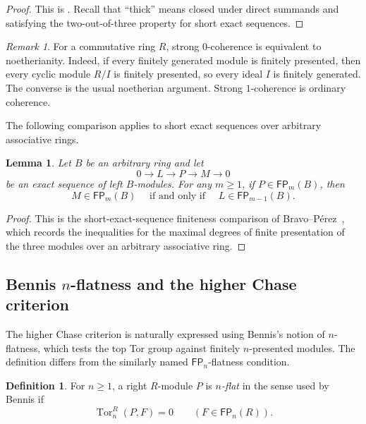 \documentclass[11pt]{article}
\numberwithin{equation}{section}
\newtheorem{lemma}[theorem]{Lemma}
\theoremstyle{definition}
\newtheorem{definition}[theorem]{Definition}
\theoremstyle{remark}
\newtheorem{remark}[theorem]{Remark}
\newcommand{\Tor}{\operatorname{Tor}}
\newcommand{\FP}{\mathsf{FP}}
\begin{document}
\begin{proof}
This is \cite[Theorem~2.4]{BravoPerez}.  Recall that ``thick'' means closed
under direct summands and satisfying the two-out-of-three property for short
exact sequences.
\end{proof}

\begin{remark}
For a commutative ring $R$, strong $0$-coherence is equivalent to
noetherianity.  Indeed, if every finitely generated module is finitely
presented, then every cyclic module $R/I$ is finitely presented, so every
ideal $I$ is finitely generated.  The converse is the usual noetherian
argument.  Strong $1$-coherence is ordinary coherence.
\end{remark}

The following comparison applies to short exact sequences over arbitrary
associative rings.

\begin{lemma}\label{lem:finite-syzygy-comparison}
Let $B$ be an arbitrary ring and let
\[
  0\longrightarrow L\longrightarrow P\longrightarrow M
  \longrightarrow0
\]
be an exact sequence of left $B$-modules.  For any $m\ge1$, if
$P\in\FP_m(B)$, then
\[
   M\in\FP_m(B)\quad\text{ if and only if }\quad
   L\in\FP_{m-1}(B).
\]
\end{lemma}
\begin{proof}
This is the short-exact-sequence finiteness comparison of
Bravo--P\'erez~\cite[Theorem~1.5, parts (1) and (3)]{BravoPerez},
which records the inequalities for the maximal degrees of finite
presentation of the three modules over an arbitrary associative ring.
\end{proof}

\subsection{Bennis \texorpdfstring{$n$}{n}-flatness and the higher Chase criterion}\label{subsec:bennis-products}

The higher Chase criterion is naturally expressed using Bennis's
notion of $n$-flatness, which tests the top Tor group against finitely
$n$-presented modules.  The definition differs from the similarly
named $\FP_n$-flatness condition.

\begin{definition}\label{sc:def:nflat}
For $n\ge1$, a right $R$-module $P$ is \emph{$n$-flat} in the sense used by
Bennis if
\[
\Tor_n^R(P,F)=0\qquad(F\in\FP_n(R)).
\]
\end{definition}
\end{document}
